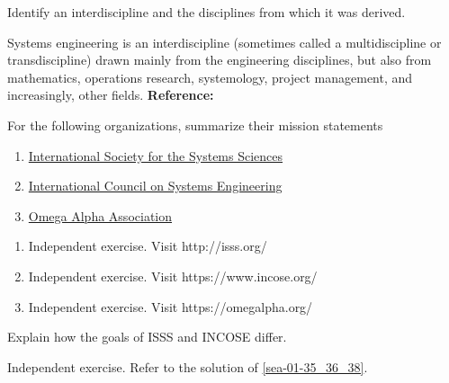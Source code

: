 \begin{exercises}
    \begin{exercise} 
    \label{sea-01-33}
        Identify an interdiscipline and the disciplines from which it was derived.
    \end{exercise}
    \begin{solution}
        Systems engineering is an interdiscipline (sometimes called a multidiscipline or transdiscipline) drawn mainly from the engineering disciplines, but also from mathematics, operations research, systemology, project management, and increasingly, other fields. \textbf{Reference:}
    \end{solution}
    
    \begin{exercise} 
    \label{sea-01-35_36_38}
        For the following organizations, summarize their mission statements
        \begin{enumerate}[label=\alph*)]
            \item \href{http://isss.org/}{International Society for the Systems Sciences}
            \item \href{https://www.incose.org/}{International Council on Systems Engineering}
            \item \href{https://omegalpha.org/}{Omega Alpha Association}
        \end{enumerate}
    \end{exercise}
    \begin{solution}
        \begin{enumerate}[label=\alph*)]
            \item Independent exercise. Visit http://isss.org/
            \item Independent exercise. Visit https://www.incose.org/
            \item Independent exercise. Visit https://omegalpha.org/
        \end{enumerate}
    \end{solution}
    
    \begin{exercise} 
    \label{sea-01-37}
        Explain how the goals of ISSS and INCOSE differ.
    \end{exercise}
    \begin{solution}
        Independent exercise. Refer to the solution of \ref{sea-01-35_36_38}.
    \end{solution}
\end{exercises}
